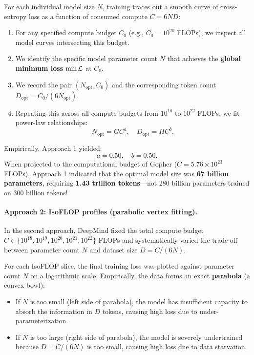 \documentclass[../../main.tex]{subfiles}
\begin{document}
For each individual model size $N$, training traces out a smooth curve of cross-entropy loss as a function of consumed compute $C = 6ND$:
\begin{enumerate}
    \item For any specified compute budget $C_0$ (e.g., $C_0 = 10^{20}$ FLOPs), we inspect all model curves intersecting this budget.
    \item We identify the specific model parameter count $N$ that achieves the \textbf{global minimum loss} $\min \mathcal{L}$ at $C_0$.
    \item We record the pair $(N_{\text{opt}}, C_0)$ and the corresponding token count $D_{\text{opt}} = C_0 / (6 N_{\text{opt}})$.
    \item Repeating this across all compute budgets from $10^{18}$ to $10^{22}$ FLOPs, we fit power-law relationships:
    \begin{equation}
    \label{eq:approach1_fits}
    N_{\text{opt}} = G C^a, \quad D_{\text{opt}} = H C^b.
    \end{equation}
\end{enumerate}
Empirically, Approach 1 yielded:
\begin{equation}
a = 0.50, \quad b = 0.50.
\end{equation}
When projected to the computational budget of Gopher ($C = 5.76 \times 10^{23}$ FLOPs), Approach 1 indicated that the optimal model size was \textbf{67 billion parameters}, requiring \textbf{1.43 trillion tokens}---not 280 billion parameters trained on 300 billion tokens!

\paragraph{Approach 2: IsoFLOP profiles (parabolic vertex fitting).}
In the second approach, DeepMind fixed the total compute budget $C \in \{10^{18}, 10^{19}, 10^{20}, 10^{21}, 10^{22}\}$ FLOPs and systematically varied the trade-off between parameter count $N$ and dataset size $D = C / (6N)$.

For each IsoFLOP slice, the final training loss was plotted against parameter count $N$ on a logarithmic scale. Empirically, the data forms an exact \textbf{parabola} (a convex bowl):
\begin{itemize}
    \item If $N$ is too small (left side of parabola), the model has insufficient capacity to absorb the information in $D$ tokens, causing high loss due to under-parameterization.
    \item If $N$ is too large (right side of parabola), the model is severely undertrained because $D = C / (6N)$ is too small, causing high loss due to data starvation.
\end{itemize}
\end{document}
